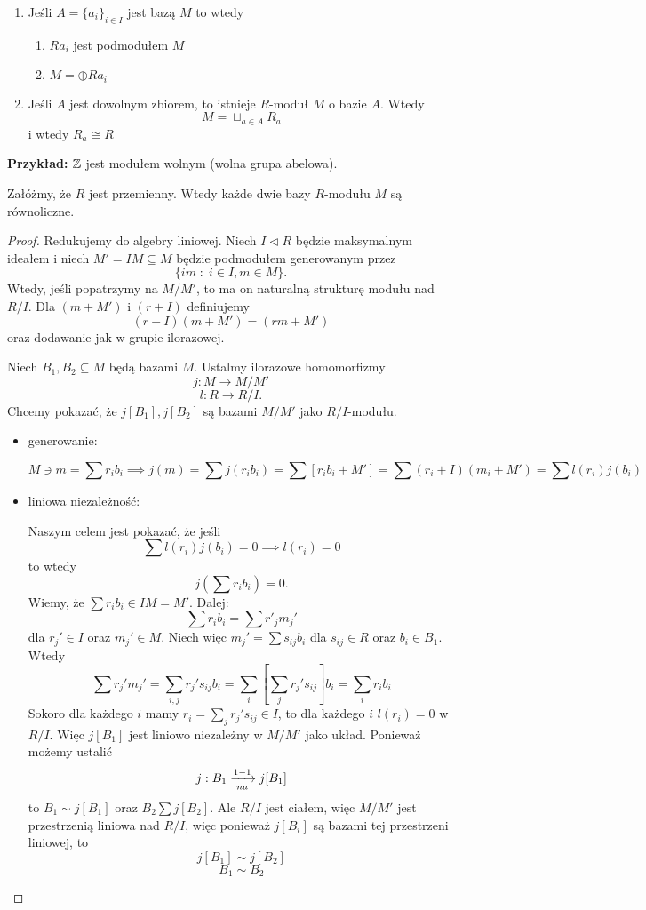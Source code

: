 \begin{remark}
  \begin{enumerate}
    \item Jeśli $A=\{a_i\}_{i\in I}$ jest bazą $M$ to wtedy
      \begin{enumerate}
        \item $Ra_i$ jest  podmodułem $M$
        \item $M=\oplus Ra_i$
      \end{enumerate}
    \item Jeśli $A$ jest dowolnym zbiorem, to istnieje $R$-moduł $M$ o bazie $A$. Wtedy
        $$M=\sqcup_{a\in A} R_a$$
        i wtedy $R_a\cong R$
  \end{enumerate}
\end{remark}
\textbf{Przykład:} $\mathbb{Z}$ jest modułem wolnym (wolna grupa abelowa).

\begin{theorem}
  Załóżmy, że $R$ jest przemienny. Wtedy każde dwie bazy $R$-modułu $M$ są równoliczne.
\end{theorem}
\begin{proof}
  Redukujemy do algebry liniowej. Niech $I\triangleleft R$ będzie maksymalnym ideałem i niech $M'=IM\subseteq M$ będzie podmodułem generowanym przez
  $$\{im\;:\;i\in I,m\in M\}.$$
  Wtedy, jeśli popatrzymy na $M/M'$, to ma on naturalną strukturę modułu nad $R/I$. Dla $(m+M')$ i $(r+I)$ definiujemy
  $$(r+I)(m+M')=(rm+M')$$
  oraz dodawanie jak w grupie ilorazowej.

  Niech $B_1,B_2\subseteq M$ będą bazami $M$. Ustalmy ilorazowe homomorfizmy
  $$j:M\to M/M'$$
  $$l:R\to R/I.$$
  Chcemy pokazać, że $j[B_1],j[B_2]$ są bazami $M/M'$ jako $R/I$-modułu.
  \begin{itemize}
    \item generowanie:
      
      $$M\ni m=\sum r_ib_i\implies j(m)=\sum j(r_ib_i)=\sum [r_ib_i+M']=\sum (r_i+I)(m_i+M')=\sum l(r_i)j(b_i)$$
    \item liniowa niezależność:

      Naszym celem jest pokazać, że jeśli 
      $$\sum l(r_i)j(b_i)=0\implies l(r_i)=0$$
      to wtedy
      $$j(\sum r_ib_i)=0.$$
      Wiemy, że $\sum r_ib_i\in IM=M'$. Dalej:
      $$\sum r_ib_i=\sum r'_jm_j'$$
      dla $r_j'\in I$ oraz $m_j'\in M$. Niech więc $m_j'=\sum s_{ij}b_i$ dla $s_{ij}\in R$ oraz $b_i\in B_1$. Wtedy
      $$\sum r_j'm_j'=\sum_{i,j} r_j's_{ij}b_i=\sum_i\left[\sum_j r_j's_{ij}\right]b_i=\sum_ir_ib_i$$
      Sokoro dla każdego $i$ mamy $r_i=\sum_jr_j's_{ij}\in I$, to dla każdego $i$ $l(r_i)=0$ w $R/I$. Więc $j[B_1]$ jest liniowo niezależny w $M/M'$ jako układ. Ponieważ możemy ustalić
      $$j:B_1\xrightarrow[na]{1-1} j[B_1]$$
      to $B_1\sim j[B_1]$ oraz $B_2\sum j[B_2]$. Ale $R/I$ jest ciałem, więc $M/M'$ jest przestrzenią liniowa nad $R/I$, więc ponieważ $j[B_i]$ są bazami tej przestrzeni liniowej, to
      $$j[B_1]\sim j[B_2]$$
      $$B_1\sim B_2$$
  \end{itemize}
\end{proof}

